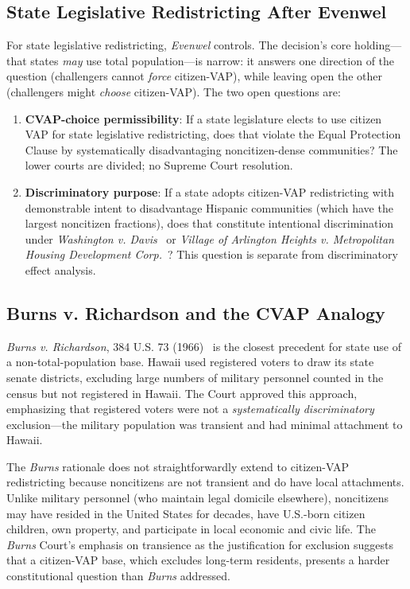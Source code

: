 \subsection{State Legislative Redistricting After Evenwel}

For state legislative redistricting, \emph{Evenwel} controls. The decision's core holding---that states \emph{may} use total population---is narrow: it answers one direction of the question (challengers cannot \emph{force} citizen-VAP), while leaving open the other (challengers might \emph{choose} citizen-VAP). The two open questions are:

\begin{enumerate}
    \item \textbf{CVAP-choice permissibility}: If a state legislature elects to use citizen VAP for state legislative redistricting, does that violate the Equal Protection Clause by systematically disadvantaging noncitizen-dense communities? The lower courts are divided; no Supreme Court resolution.

    \item \textbf{Discriminatory purpose}: If a state adopts citizen-VAP redistricting with demonstrable intent to disadvantage Hispanic communities (which have the largest noncitizen fractions), does that constitute intentional discrimination under \emph{Washington v. Davis}~\citep{washingtondavis1976} or \emph{Village of Arlington Heights v. Metropolitan Housing Development Corp.}~\citep{arlingtonheights1977}? This question is separate from discriminatory effect analysis.
\end{enumerate}

\subsection{Burns v. Richardson and the CVAP Analogy}

\emph{Burns v. Richardson}, 384 U.S. 73 (1966)~\citep{burns1966} is the closest precedent for state use of a non-total-population base. Hawaii used registered voters to draw its state senate districts, excluding large numbers of military personnel counted in the census but not registered in Hawaii. The Court approved this approach, emphasizing that registered voters were not a \emph{systematically discriminatory} exclusion---the military population was transient and had minimal attachment to Hawaii.

The \emph{Burns} rationale does not straightforwardly extend to citizen-VAP redistricting because noncitizens are not transient and do have local attachments. Unlike military personnel (who maintain legal domicile elsewhere), noncitizens may have resided in the United States for decades, have U.S.-born citizen children, own property, and participate in local economic and civic life. The \emph{Burns} Court's emphasis on transience as the justification for exclusion suggests that a citizen-VAP base, which excludes long-term residents, presents a harder constitutional question than \emph{Burns} addressed.

